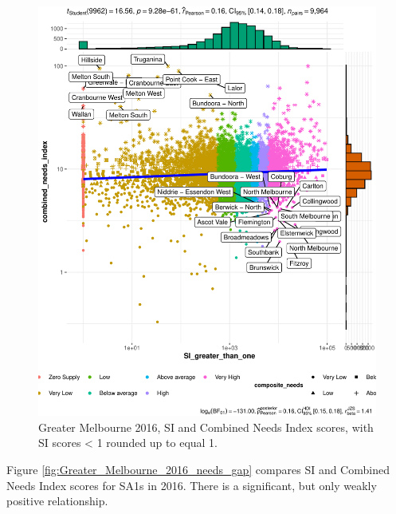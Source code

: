 \documentclass[preprint, 3p,
authoryear]{elsarticle} %
\begin{document}
\begin{figure}
\centering
\includegraphics{Leveraging_GTFS_to_assess_transit_supply_Transport_Geography_files/figure-latex/Greater_Melbourne_2016_needs_gap-1.pdf}
\caption{Greater Melbourne 2016, SI and Combined Needs Index scores,
with SI scores \textless{} 1 rounded up to equal 1.}
\end{figure}

Figure \ref{fig:Greater_Melbourne_2016_needs_gap} compares SI and
Combined Needs Index scores for SA1s in 2016. There is a significant,
but only weakly positive relationship.
\end{document}
